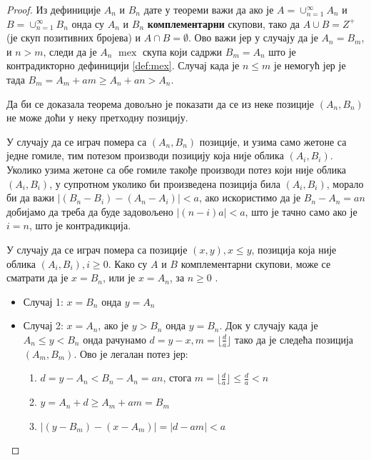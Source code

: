 \documentclass[a4paper]{article}
\DeclareMathOperator{\mex}{mex}
\begin{document}
\begin{proof}
	
	Из дефиниције $ A_{n} $ и $ B_{n} $ дате у теореми важи да ако је $ A = \cup_{n=1}^{\infty} A_{n} $ и  $ B = \cup_{n=1}^{\infty} B_{n} $ онда су $ A_{n} $ и $ B_{n} $ \textbf{комплементарни} скупови, тако да $ A \cup B = Z^{+} $ (је скуп позитивних бројева)  и $ A \cap B = \emptyset $. Ово важи јер у случају да је $ A_{n} = B_{m} $, и $ n > m $, следи да је $ A_{n} $ $ \mex $ скупа који садржи $ B_{m} = A_{n} $ што је контрадикторно дефиницији \ref{def:mex}. Случај када је $ n \leq m $ је немогућ јер је тада $ B_{m} = A_{m} + am \geq  A_{n} + an > A_{n} $.
	
	Да би се доказала теорема довољно је показати да се из неке позиције $ (A_{n}, B_{n}) $ не може доћи у неку претходну позицију.
	
	У случају да се играч помера са $ (A_{n}, B_{n}) $ позиције, и узима само жетоне са једне гомиле, тим потезом производи позицију која није облика $ (A_{i}, B_{i}) $. Уколико узима жетоне са обе гомиле такође производи потез који није облика $ (A_{i}, B_{i}) $, у супротном уколико би произведена позиција била $ (A_{i}, B_{i}) $, морало би да важи $ |(B_{n} - B_{i}) - (A_{n}-A_{i})| < a $, ако искористимо да је $ B_{n} - A_{n} = an $ добијамо да треба да буде задовољено $ |(n-i)a| < a $, што је тачно само ако је $ i = n $, што је контрадикција. 
	
	У случају да се играч помера са позиције $ (x, y), x \le y $, позиција која није облика $ (A_{i}, B_{i}), i \ge 0 $. Како су $ A $ и $ B $ комплементарни скупови, може се сматрати да је $ x = B_{n} $, или је $ x = A_{n} $, за $ n \ge 0 $ .
	\begin{itemize}
		\item \label{case:slucaj1} Случај 1: $ x = B_{n} $ онда $ y = A_{n} $ 
		\item \label{case:slucaj2} Случај 2: $ x = A_{n} $, ако је $ y > B_{n} $ онда $ y = B_{n} $. Док у случају када је $ A_{n} \le y < B_{n} $ онда рачунамо $ d = y - x, m = \lfloor \frac{d}{a} \rfloor $ тако да је следећа позиција $ (A_{m}, B_{m}) $. Ово је легалан потез јер:
		\begin{enumerate}
			\item $ d = y - A_{n} < B_{n} - A_{n} = an $, стога $ m = \lfloor \frac{d}{a} \rfloor \le \frac{d}{a} < n $
			\item $ y = A_{n} + d \ge A_{m} + am = B_m $
			\item $ |(y - B_{m}) - (x - A_{m})| = |d - am| < a $
		\end{enumerate}
	\end{itemize}
	
\end{proof}
\end{document}
